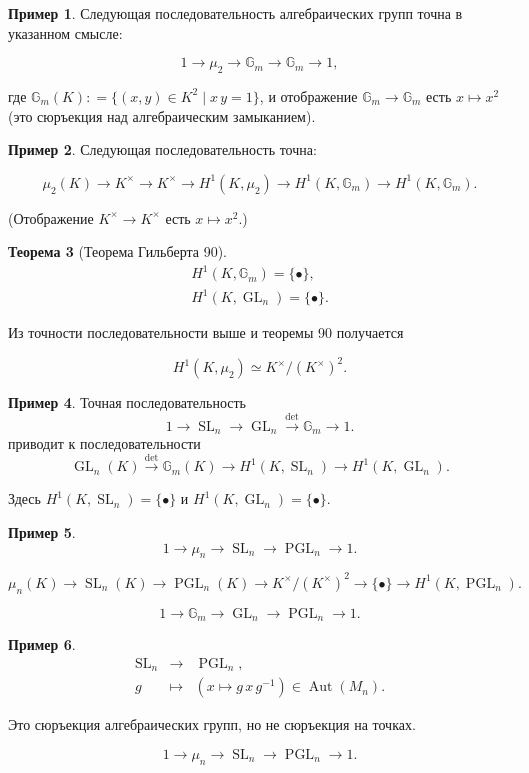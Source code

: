 \documentclass[a4paper]{article}
\DeclareMathOperator{\Aut}{Aut}
\DeclareMathOperator{\PGL}{PGL}
\DeclareMathOperator{\GL}{GL}
\DeclareMathOperator{\SL}{SL}
\newcommand{\dfn}{\mathrel{\mathop:}=}
\newcommand{\isom}{\simeq}
\newtheorem{theorem}{Теорема}[subsection]
\theoremstyle{definition}
\newtheorem{example}[theorem]{Пример}
\begin{document}
\begin{example}
Следующая последовательность алгебраических групп точна в указанном смысле:

\[ 1 \to \mu_2 \to \mathbb{G}_m \to \mathbb{G}_m \to 1, \]

\noindent где $\mathbb{G}_m (K) \dfn \{ (x,y)\in K^2 \mid x\,y = 1 \}$, и
отображение $\mathbb{G}_m \to \mathbb{G}_m$ есть $x \mapsto x^2$ (это
сюръекция над алгебраическим замыканием).
\end{example}

\begin{example}
Следующая последовательность точна:

\[ \mu_2 (K) \to K^\times \to K^\times \to H^1 (K,\mu_2) \to H^1
(K,\mathbb{G}_m) \to H^1 (K,\mathbb{G}_m). \]
\end{example}

\noindent (Отображение $K^\times \to K^\times$ есть $x \mapsto x^2$.)

\begin{theorem}[Теорема Гильберта 90]

\begin{gather*}
H^1 (K,\mathbb{G}_m) = \{\bullet\},\\
H^1 (K,\GL_n) = \{\bullet\}.
\end{gather*}
\end{theorem}

Из точности последовательности выше и теоремы 90 получается

\[ H^1 (K,\mu_2) \isom K^\times / (K^\times)^2. \]

\begin{example}
Точная последовательность
\[ 1 \to \SL_n \to \GL_n \xrightarrow{\det} \mathbb{G}_m \to 1. \]
приводит к последовательности
\[ \GL_n (K) \xrightarrow{\det} \mathbb{G}_m (K) \to H^1 (K,\SL_n) \to H^1 (K,\GL_n). \]

Здесь $H^1 (K,\SL_n) = \{\bullet\}$ и $H^1 (K,\GL_n) = \{\bullet\}$.
\end{example}

\begin{example}
\[ 1 \to \mu_n \to \SL_n \to \PGL_n \to 1. \]

\[ \mu_n (K) \to \SL_n (K) \to \PGL_n (K) \to K^\times / (K^\times)^2 \to \{\bullet\} \to H^1 (K,\PGL_n). \]

\[ 1 \to \mathbb{G}_m \to \GL_n \to \PGL_n \to 1. \]
\end{example}

\begin{example}
\begin{eqnarray*}
\SL_n & \to & \PGL_n,\\
g & \mapsto & (x \mapsto g\,x\,g^{-1}) \in \Aut (M_n).
\end{eqnarray*}

Это сюръекция алгебраических групп, но не сюръекция на точках.

\[ 1 \to \mu_n \to \SL_n \to \PGL_n \to 1. \]
\end{example}
\end{document}
